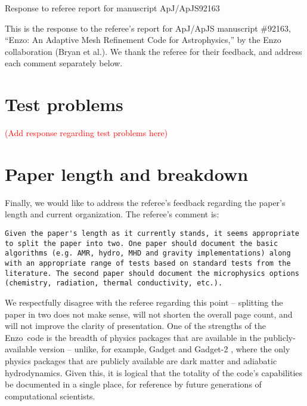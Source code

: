 \documentclass[11pt]{article}
\newcommand{\red}[1]{\textcolor{red}{#1}}
\newcommand{\code}[1]{\textsf{#1}}
\newcommand{\enzo}{\code{Enzo}}
\begin{document}
\begin{center} 
\bfseries{
\begin{large}
Response to referee report for manuscript  ApJ/ApJS92163
\end{large}
}
\end{center}



This is the response to the referee's report for ApJ/ApJS manuscript
\#92163, ``Enzo: An Adaptive Mesh Refinement Code for Astrophysics,''
by the Enzo collaboration (Bryan et al.).  We thank the referee for
their feedback, and address each comment separately below.

\section{Test problems}

\red{(Add response regarding test problems here)}

\section{Paper length and breakdown}

Finally, we would like to address the referee's feedback regarding the
paper's length and current organization.  The referee's comment is:

\begin{verbatim} 
Given the paper's length as it currently stands, it seems appropriate
to split the paper into two. One paper should document the basic
algorithms (e.g. AMR, hydro, MHD and gravity implementations) along
with an appropriate range of tests based on standard tests from the
literature. The second paper should document the microphysics options
(chemistry, radiation, thermal conductivity, etc.).
\end{verbatim}

We respectfully disagree with the referee regarding this point --
splitting the paper in two does not make sense, will not shorten the
overall page count, and will not improve the clarity of presentation. One of the strengths
of the \enzo\ code is the breadth of physics packages that are
available in the publicly-available version -- unlike, for example,
Gadget and Gadget-2 \citep{2001NewA....6...79S, 2005MNRAS.364.1105S},
where the only physics packages that are publicly available are dark
matter and adiabatic hydrodynamics.  Given this, it is logical that
the totality of the code's capabilities be documented in a single
place, for reference by future generations of computational scientists.
\end{document}
